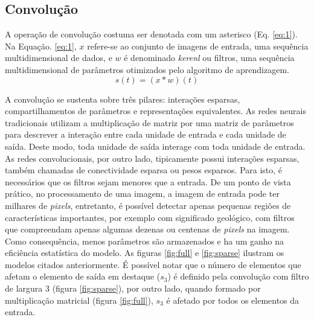 \subsection{Convolução}

A operação de convolução costuma ser denotada com um asterisco (Eq. \ref{eq:1}).
Na Equação. \ref{eq:1}, $x$ refere-se ao conjunto de imagens de entrada, uma sequência multidimensional
de dados, e $w$ é denominado \textit{kerenl} ou filtros, uma sequência multidimensional de parâmetros otimizados pelo algoritmo
de aprendizagem.
\begin{equation}
 s(t) = (x * w)(t)
 \label{eq:1}
\end{equation}

A convolução se sustenta sobre três pilares: interações esparsas, compartilhamentos
de parâmetros e representações equivalentes. As redes neurais tradicionais
utilizam a multiplicação de matriz por uma matriz de parâmetros para descrever
a interação entre cada unidade de entrada e cada unidade de saída. Deste modo,
toda unidade de saída interage com toda unidade de entrada.
As redes convolucionais, por outro lado, tipicamente possui interações
esparsas, também chamadas de conectividade esparsa ou pesos esparsos.
Para isto, é necessários que os filtros sejam menores que a entrada.
De um ponto de vista prático, no processamento de uma imagem,
a imagem de entrada pode ter milhares de \textit{pixels}, entretanto, é 
possível detectar apenas pequenas regiões de características importantes,
por exemplo com significado geológico, com filtros que compreendam apenas
algumas dezenas ou centenas de \textit{pixels} na imagem. Como consequência,
menos parâmetros são armazenados e ha um ganho na eficiência estatística do
modelo. As figuras \ref{fig:full} e \ref{fig:sparse} ilustram
os modelos citados anteriormente. É possível notar que o número de elementos
que afetam o elemento de saída em destaque ($s_3$) é definido pela convolução
com filtro de largura 3 (figura \ref{fig:sparse}), por outro lado, quando formado por multiplicação
matricial (figura \ref{fig:full}), $s_3$ é
afetado por todos os elementos da entrada.

